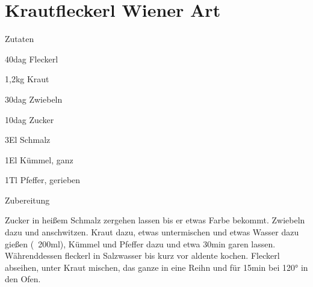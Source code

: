 \chapter*{Krautfleckerl Wiener Art}
\begin{multicols}{2}
 {\Large Zutaten}
 \begin{Zutaten}
		\item 40dag Fleckerl
		\item 1,2kg Kraut
		\item 30dag Zwiebeln
		\item 10dag Zucker
		\item 3El Schmalz
		\item 1El Kümmel, ganz
		\item 1Tl Pfeffer, gerieben
		
		
\end{Zutaten}
	
\columnbreak
\end{multicols}

{\Large Zubereitung} \newline
\begin{addmargin}[1cm]{0cm}
	Zucker in heißem Schmalz zergehen lassen bis er etwas Farbe bekommt.
	Zwiebeln dazu und anschwitzen.\newline
	Kraut dazu, etwas untermischen und etwas Wasser dazu gießen (~200ml), Kümmel und Pfeffer dazu und
	etwa 30min garen lassen.\newline
	Währenddessen fleckerl in Salzwasser bis kurz vor aldente kochen.
	Fleckerl abseihen, unter Kraut mischen, das ganze in eine Reihn und für 15min bei 120° in den Ofen.
	
	
	
\end{addmargin}
